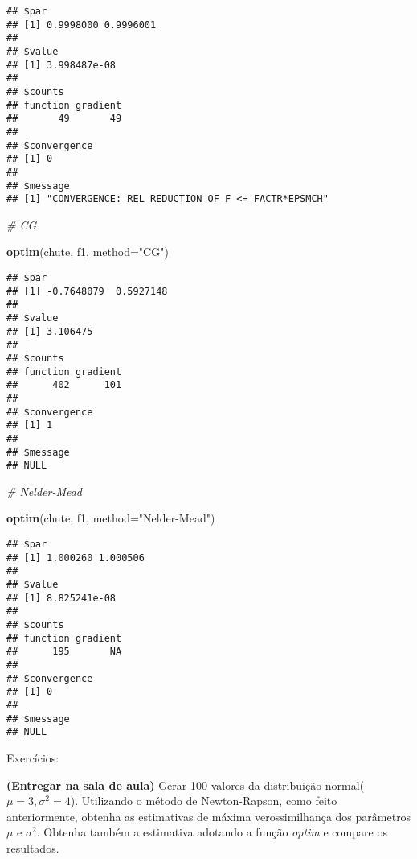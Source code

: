 \documentclass[
]{article}
\newenvironment{Shaded}{\begin{snugshade}}{\end{snugshade}}
\newcommand{\AttributeTok}[1]{\textcolor[rgb]{0.13,0.29,0.53}{#1}}
\newcommand{\CommentTok}[1]{\textcolor[rgb]{0.56,0.35,0.01}{\textit{#1}}}
\newcommand{\FunctionTok}[1]{\textcolor[rgb]{0.13,0.29,0.53}{\textbf{#1}}}
\newcommand{\NormalTok}[1]{#1}
\newcommand{\StringTok}[1]{\textcolor[rgb]{0.31,0.60,0.02}{#1}}
\begin{document}
\begin{verbatim}
## $par
## [1] 0.9998000 0.9996001
## 
## $value
## [1] 3.998487e-08
## 
## $counts
## function gradient 
##       49       49 
## 
## $convergence
## [1] 0
## 
## $message
## [1] "CONVERGENCE: REL_REDUCTION_OF_F <= FACTR*EPSMCH"
\end{verbatim}

\begin{Shaded}
\begin{Highlighting}[]
\CommentTok{\# CG}

\FunctionTok{optim}\NormalTok{(chute, f1, }\AttributeTok{method=}\StringTok{"CG"}\NormalTok{)}
\end{Highlighting}
\end{Shaded}

\begin{verbatim}
## $par
## [1] -0.7648079  0.5927148
## 
## $value
## [1] 3.106475
## 
## $counts
## function gradient 
##      402      101 
## 
## $convergence
## [1] 1
## 
## $message
## NULL
\end{verbatim}

\begin{Shaded}
\begin{Highlighting}[]
\CommentTok{\# Nelder{-}Mead}

\FunctionTok{optim}\NormalTok{(chute, f1, }\AttributeTok{method=}\StringTok{"Nelder{-}Mead"}\NormalTok{)}
\end{Highlighting}
\end{Shaded}

\begin{verbatim}
## $par
## [1] 1.000260 1.000506
## 
## $value
## [1] 8.825241e-08
## 
## $counts
## function gradient 
##      195       NA 
## 
## $convergence
## [1] 0
## 
## $message
## NULL
\end{verbatim}

Exercícios:

\textbf{(Entregar na sala de aula)} Gerar 100 valores da distribuição
normal(\(\mu=3, \sigma^2=4\)). Utilizando o método de Newton-Rapson,
como feito anteriormente, obtenha as estimativas de máxima
verossimilhança dos parâmetros \(\mu\) e \(\sigma^2\). Obtenha também a
estimativa adotando a função \emph{optim} e compare os resultados.
\end{document}

